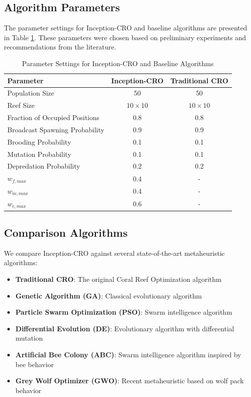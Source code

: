 \subsection{Algorithm Parameters}

The parameter settings for Inception-CRO and baseline algorithms are presented in Table \ref{tab:parameters}. These parameters were chosen based on preliminary experiments and recommendations from the literature.

\begin{table}[htbp]
\centering
\caption{Parameter Settings for Inception-CRO and Baseline Algorithms}
\label{tab:parameters}
\begin{tabular}{@{}lcc@{}}
\toprule
Parameter & Inception-CRO & Traditional CRO \\
\midrule
Population Size & 50 & 50 \\
Reef Size & $10 \times 10$ & $10 \times 10$ \\
Fraction of Occupied Positions & 0.8 & 0.8 \\
Broadcast Spawning Probability & 0.9 & 0.9 \\
Brooding Probability & 0.1 & 0.1 \\
Mutation Probability & 0.1 & 0.1 \\
Depredation Probability & 0.2 & 0.2 \\
$w_{f,max}$ & 0.4 & - \\
$w_{m,max}$ & 0.4 & - \\
$w_{c,max}$ & 0.6 & - \\
\bottomrule
\end{tabular}
\end{table}

\subsection{Comparison Algorithms}

We compare Inception-CRO against several state-of-the-art metaheuristic algorithms:

\begin{itemize}
    \item \textbf{Traditional CRO}: The original Coral Reef Optimization algorithm
    \item \textbf{Genetic Algorithm (GA)}: Classical evolutionary algorithm
    \item \textbf{Particle Swarm Optimization (PSO)}: Swarm intelligence algorithm
    \item \textbf{Differential Evolution (DE)}: Evolutionary algorithm with differential mutation
    \item \textbf{Artificial Bee Colony (ABC)}: Swarm intelligence algorithm inspired by bee behavior
    \item \textbf{Grey Wolf Optimizer (GWO)}: Recent metaheuristic based on wolf pack behavior
\end{itemize}

